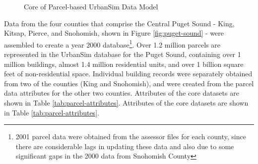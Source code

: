 \begin{figure}[h]
\center {}
\caption{Core of Parcel-based UrbanSim Data Model} \label{fig:data-model-2}
\end{figure}


Data from the four counties that comprise the Central Puget Sound - King, Kitsap, Pierce, and Snohomish, shown in Figure \ref{fig:puget-sound} - were assembled to create a year 2000 database\footnote{2001 parcel data were obtained from the assessor files for each county, since there are considerable lags in updating these data
and also due to some significant gaps in the 2000 data from Snohomish County}.  Over 1.2 million parcels are represented in the UrbanSim database
for the Puget Sound, containing over 1 million buildings, almost 1.4 million residential units, and over 1 billion square feet of non-residential space.  Individual building records were separately obtained from two of the counties (King and Snohomish), and were created from
the parcel data attributes for the other two counties.  Attributes of the core datasets are shown in Table \ref{tab:parcel-attributes}. Attributes of the core datasets are shown in Table \ref{tab:parcel-attributes}.

